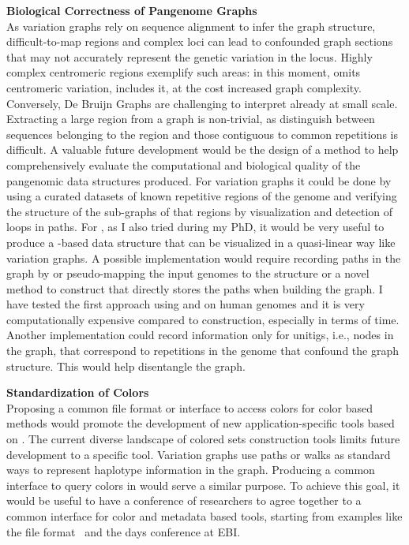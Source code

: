 \textbf{Biological Correctness of Pangenome Graphs}\\
As variation graphs rely on sequence alignment to infer the graph structure, difficult-to-map regions and complex loci can lead to confounded graph sections that may not accurately represent the genetic variation in the locus. Highly complex centromeric regions exemplify such areas: in this moment, \mcactus omits centromeric variation, \pggb includes it, at the cost increased graph complexity. \\
Conversely, De Bruijn Graphs are challenging to interpret already at small scale. Extracting a large region from a graph is non-trivial, as distinguish between sequences belonging to the region and those contiguous to common repetitions is difficult.
A valuable future development would be the design of a method to help comprehensively evaluate the computational and biological quality of the pangenomic data structures produced. For variation graphs it could be done by using a curated datasets of known repetitive regions of the genome and verifying the structure of the sub-graphs of that regions by visualization and detection of loops in paths. For \dbgs, as I also tried during my PhD, it would be very useful to produce a \dbg-based data structure that can be visualized in a quasi-linear way like variation graphs. A possible implementation would require recording paths in the graph by or pseudo-mapping the input genomes to the \ccdbg structure or a novel method to construct \cdbgs that directly stores the paths when building the graph. I have tested the first approach using \ggcat and \ssh on human genomes and it is very computationally expensive compared to \ccdbg construction, especially in terms of time. Another implementation could record information only for unitigs, i.e., nodes in the graph, that correspond to repetitions in the genome that confound the graph structure. This would help disentangle the graph.


\textbf{Standardization of \dbg Colors}\\
Proposing a common file format or interface to access colors for color \dbg based methods would promote the development of new application-specific tools based on \kmers. The current diverse landscape of colored \kmer sets construction tools limits future development to a specific tool. Variation graphs use paths or walks as standard ways to represent haplotype information in the graph. Producing a common interface to query colors in \dbgs would serve a similar purpose. To achieve this goal, it would be useful to have a conference of \kmer researchers to agree together to a common interface for color and metadata based tools, starting from examples like the \kmer file format~\cite{kff} and the \kmer days conference at EBI.


